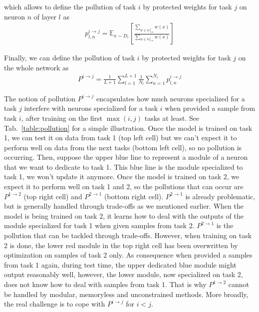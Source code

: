 \documentclass[11pt]{article}
\begin{document}
\vspace{2mm}
\noindent
which allows to define the pollution of task $i$ by protected weights for task $j$ on neuron $n$ of layer $l$ as
\begin{align}
    p_{l,n}^{i\rightarrow j} = \mathbb{E}_{x \sim D_i}\left[\frac{\sum_{w \in \mathbb{W}_{l,n}^j}{w(x)}}{\sum_{w \in \mathbb{W}_{l,n}^i}{w(x)}}\right]
\end{align}

\vspace{2mm}
\noindent
Finally, we can define the pollution of task $i$ by protected weights for task $j$ on the whole network as
\begin{align}
    P^{i\rightarrow j} = \frac{1}{L+1}\sum_{l=1}^{L+1}{\frac{1}{N_l}\sum_{n=1}^{N_l}{p_{l,n}^{i\rightarrow j}}}
\end{align}

\vspace{2mm}
\noindent
The notion of pollution $P^{i\rightarrow j}$ encapsulates how much neurons specialized for a task $j$ interfere with neurons specialized for a task $i$ when provided a sample from task $i$, after training on the first $\max(i,j)$ tasks at least. See Tab.~\ref{table:pollution} for a simple illustration. Once the model is trained on task 1, we can test it on data from task 1 (top left cell) but we can't expect it to perform well on data from the next tasks (bottom left cell), so no pollution is occurring. Then, suppose the upper blue line to represent a module of a neuron that we want to dedicate to task 1. This blue line is the module specialized to task 1, we won't update it anymore. Once the model is trained on task 2, we expect it to perform well on task 1 and 2, so the pollutions that can occur are $P^{1\rightarrow 2}$ (top right cell) and $P^{2\rightarrow 1}$ (bottom right cell). $P^{2\rightarrow 1}$ is already problematic, but is generally handled through trade-offs as we mentioned earlier. When the model is being trained on task 2, it learns how to deal with the outputs of the module specialized for task 1 when given samples from task 2. $P^{2\rightarrow 1}$ is the pollution that can be tackled through trade-offs. However, when training on task 2 is done, the lower red module in the top right cell has been overwritten by optimization on samples of task 2 only. As consequence when provided a samples from task 1 again, during test time, the upper dedicated blue module might output reasonably well, however, the lower module, now specialized on task 2, does not know how to deal with samples from task 1. That is why $P^{1\rightarrow 2}$ cannot be handled by modular, memoryless and unconstrained methods. More broadly, the real challenge is to cope with $P^{i\rightarrow j}$ for $i<j$.
\end{document}
